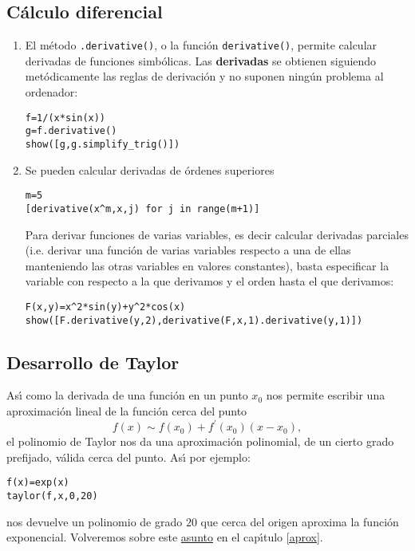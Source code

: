 \subsection{C\'alculo diferencial}
\begin{enumerate}
 \item El método  \lstinline|.derivative()|, o la función 
\lstinline|derivative()|, permite
calcular derivadas de funciones simbólicas. Las \textbf{derivadas}  se obtienen
siguiendo
metódicamente las reglas de derivación y no suponen ningún problema al
ordenador:
\begin{lstlisting}[numbers=none]
f=1/(x*sin(x))
g=f.derivative()
show([g,g.simplify_trig()])
\end{lstlisting}


\item Se pueden calcular derivadas de órdenes superiores
\begin{lstlisting}[numbers=none]
m=5
[derivative(x^m,x,j) for j in range(m+1)]
\end{lstlisting}

Para derivar funciones de varias variables, es decir calcular derivadas
parciales (i.e. derivar una funci\'on de varias variables respecto a una de
ellas manteniendo las otras variables en valores constantes), basta especificar
la variable con respecto a la que derivamos y
el orden hasta el que derivamos: 
\begin{lstlisting}[numbers=none]
F(x,y)=x^2*sin(y)+y^2*cos(x)
show([F.derivative(y,2),derivative(F,x,1).derivative(y,1)])
\end{lstlisting}
\end{enumerate}

\subsection{Desarrollo de Taylor}\label{taylor}
As\'{\i} como la derivada  de una funci\'on en un punto $x_0$ nos permite
escribir una aproximaci\'on lineal de la funci\'on {\sc cerca del punto}
\[f(x)\sim f(x_0)+f^{\prime}(x_0)(x-x_0),\]
\noindent el polinomio de Taylor nos da una aproximaci\'on polinomial, de un
cierto grado prefijado, v\'alida {\sc cerca del punto}. As\'{\i} por ejemplo:
\begin{lstlisting}[numbers=none]
f(x)=exp(x)
taylor(f,x,0,20)
\end{lstlisting}
\noindent nos devuelve un polinomio de grado $20$ que cerca del origen aproxima 
la funci\'on exponencial. Volveremos sobre este \hyperref[taylor]{asunto} en el
cap\'{\i}tulo
\ref{aprox}.

